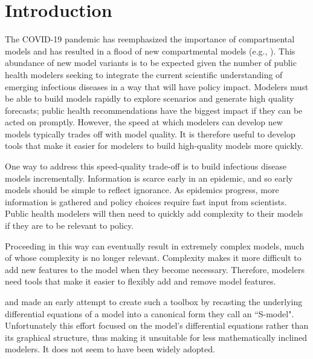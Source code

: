 \documentclass{article}
\theoremstyle{definition}
\begin{document}

\section{Introduction}\label{intro}
The COVID-19 pandemic has reemphasized the importance of compartmental models \citep{abou2020compartmental, massonis2021structural, adam2020special, currie2020simulation, lofgren2014mathematical, mcbryde2020role, enserink2020covid} and has resulted in a flood of new compartmental models (e.g., \cite{friston2020dynamic, fields2021age, chang2022stochastic, lavielle2020extension, balabdaoui2020age, leontitsis2021seahir}). 
This abundance of new model variants is to be expected given the number of public health modelers seeking to integrate the current scientific understanding of emerging infectious diseases in a way that will have policy impact. Modelers must be able to build models rapidly to explore scenarios and generate high quality forecasts; public health recommendations have the biggest impact if they can be acted on promptly. However, the speed at which modelers can develop new models typically trades off with model quality. It is therefore useful to develop tools that make it easier for modelers to build high-quality models more quickly.

One way to address this speed-quality trade-off is to build infectious disease models incrementally. Information is scarce early in an epidemic, and so early models should be simple to reflect ignorance. As epidemics progress, more information is gathered and policy choices require fast input from scientists. Public health modelers will then need to quickly add complexity to their models if they are to be relevant to policy. 

Proceeding in this way can eventually result in extremely complex models, much of whose complexity is no longer relevant. Complexity makes it more difficult to add new features to the model when they become necessary. Therefore, modelers need tools that make it easier to flexibly add and remove model features. 

\cite{savageau1988introduction} and \cite{voit1988recasting, voit1990s} made an early attempt to create such a toolbox by recasting the underlying differential equations of a model into a canonical form they call an ``S-model". Unfortunately this effort focused on the model's differential equations rather than its graphical structure, thus making it unsuitable for less mathematically inclined modelers. It does not seem to have been widely adopted.
\end{document}
